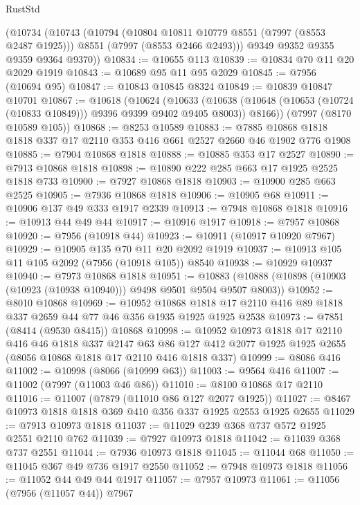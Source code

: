 \begin{lexlean}{RustStd}
\begin{coremodule}
    (@10734
      (@10743
        (@10794
          (@10804 @10811 @10779 @8551 (@7997 (@8553 @2487 @1925)))
          @8551
          (@7997 (@8553 @2466 @2493)))
        @9349
        @9352
        @9355
        @9359
        @9364
        @9370))
@10834 := @10655 @113
@10839 := @10834 @70 @11 @20 @2029 @1919
@10843 := @10689 @95 @11 @95 @2029
@10845 := @7956 (@10694 @95)
@10847 := @10843 @10845 @8324
@10849 := @10839 @10847 @10701
@10867 := @10618
    (@10624
      (@10633
        (@10638 (@10648 (@10653 (@10724 (@10833 @10849))) @9396 @9399 @9402 @9405 @8003))
        @8166))
    (@7997 (@8170 @10589 @105))
@10868 := @8253 @10589
@10883 := @7885 @10868 @1818 @1818 @337 @17 @2110 @353 @416 @661 @2527 @2660 @46 @1902 @776 @1908
@10885 := @7904 @10868 @1818
@10888 := @10885 @353 @17 @2527
@10890 := @7913 @10868 @1818
@10898 := @10890 @222 @285 @663 @17 @1925 @2525 @1818 @733
@10900 := @7927 @10868 @1818
@10903 := @10900 @285 @663 @2525
@10905 := @7936 @10868 @1818
@10906 := @10905 @68
@10911 := @10906 @137 @49 @333 @1917 @2339
@10913 := @7948 @10868 @1818
@10916 := @10913 @44 @49 @44
@10917 := @10916 @1917
@10918 := @7957 @10868
@10920 := @7956 (@10918 @44)
@10923 := @10911 (@10917 @10920 @7967)
@10929 := @10905 @135 @70 @11 @20 @2092 @1919
@10937 := @10913 @105 @11 @105 @2092 (@7956 (@10918 @105)) @8540
@10938 := @10929 @10937
@10940 := @7973 @10868 @1818
@10951 := @10883 (@10888 (@10898 (@10903 (@10923 (@10938 @10940))) @9498 @9501 @9504 @9507 @8003))
@10952 := @8010 @10868
@10969 := @10952
    @10868
    @1818
    @17
    @2110
    @416
    @89
    @1818
    @337
    @2659
    @44
    @77
    @46
    @356
    @1935
    @1925
    @1925
    @2538
@10973 := @7851 (@8414 (@9530 @8415)) @10868
@10998 := @10952
    @10973
    @1818
    @17
    @2110
    @416
    @46
    @1818
    @337
    @2147
    @63
    @86
    @127
    @412
    @2077
    @1925
    @1925
    @2655
    (@8056 @10868 @1818 @17 @2110 @416 @1818 @337)
@10999 := @8086 @416
@11002 := @10998 (@8066 (@10999 @63))
@11003 := @9564 @416
@11007 := @11002 (@7997 (@11003 @46 @86))
@11010 := @8100 @10868 @17 @2110
@11016 := @11007 (@7879 (@11010 @86 @127 @2077 @1925))
@11027 := @8467 @10973 @1818 @1818 @369 @410 @356 @337 @1925 @2553 @1925 @2655
@11029 := @7913 @10973 @1818
@11037 := @11029 @239 @368 @737 @572 @1925 @2551 @2110 @762
@11039 := @7927 @10973 @1818
@11042 := @11039 @368 @737 @2551
@11044 := @7936 @10973 @1818
@11045 := @11044 @68
@11050 := @11045 @367 @49 @736 @1917 @2550
@11052 := @7948 @10973 @1818
@11056 := @11052 @44 @49 @44 @1917
@11057 := @7957 @10973
@11061 := @11056 (@7956 (@11057 @44)) @7967

\end{coremodule}
\end{lexlean}
